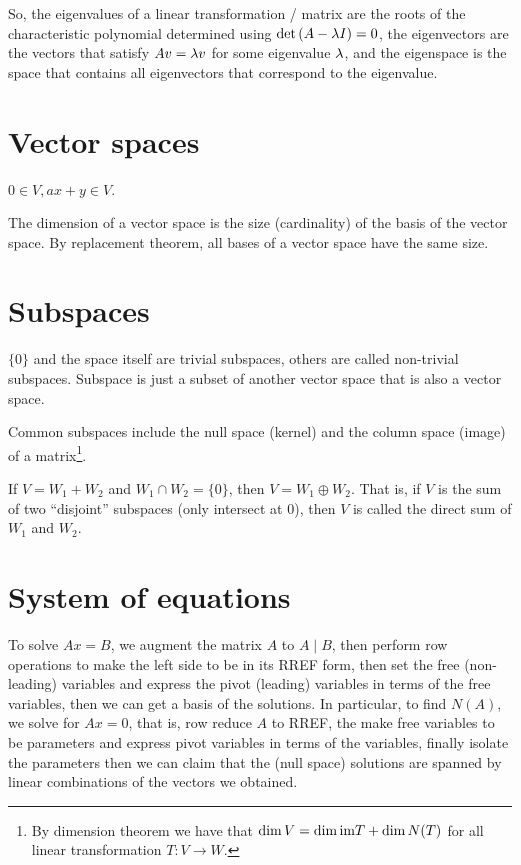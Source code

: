 \documentclass[11pt, cyan, night, 1in]{LatexTemplate/hw}
\begin{document}
So, the eigenvalues of a linear transformation / matrix are the roots of the characteristic polynomial determined using $\det\left(A - \lambda I\right)=0$, the eigenvectors are the vectors that satisfy $Av=\lambda v$ for some eigenvalue $\lambda$, and the eigenspace is the space that contains all eigenvectors that correspond to the  eigenvalue.



\section{Vector spaces}

$0\in V, ax+y\in V$.

The dimension of a vector space is the size (cardinality) of the basis of the vector space. By replacement theorem, all bases of a vector space have the same size.

\section{Subspaces}

$\{0\}$ and the space itself are trivial subspaces, others are called non-trivial subspaces. Subspace is just a subset of another vector space that is also a vector space.

Common subspaces include the null space (kernel) and the column space (image) of a matrix\footnote{By dimension theorem we have that $\dim V = \dim \text{im} T + \dim N(T)$ for all linear transformation $T: V\to W$.}.

If $V=W_1+W_2$ and $W_1\cap W_2=\{0\}$, then $V=W_1\oplus W_2$. That is, if $V$ is the sum of two ``disjoint'' subspaces (only intersect at $0$), then $V$ is called the direct sum of $W_1$ and $W_2$.

\section{System of equations}

To solve $Ax=B$, we augment the matrix $A$ to $A\mid B$, then perform row operations to make the left side to be in its RREF form, then set the free (non-leading) variables and express the pivot (leading) variables in terms of the free variables, then we can get a basis of the solutions. In particular, to find $N(A)$, we solve for $Ax=0$, that is, row reduce $A$ to RREF, the make free variables to be parameters and express pivot variables in terms of the variables, finally isolate the parameters then we can claim that the (null space) solutions are spanned by linear combinations of the vectors we obtained.
\end{document}
